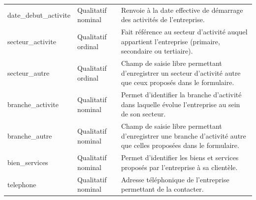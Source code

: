 \documentclass[12pt, a4paper, oneside]{report}
\begin{document}
\begin{table}[H]
\begin{tabularx}{\textwidth}{
				>{\ttfamily\raggedright\arraybackslash}p{3.8cm}
				>{\raggedright\arraybackslash}p{2.8cm}
				>{\raggedright\arraybackslash}X}
			\rowcolor{lightgray}
			date\_debut\_activite
			& Qualitatif nominal
			& Renvoie à la date effective de démarrage des activités
			de l'entreprise. \\
			
			secteur\_activite
			& Qualitatif ordinal
			& Fait référence au secteur d'activité auquel appartient
			l'entreprise (primaire, secondaire ou tertiaire). \\
			
			\rowcolor{lightgray}
			secteur\_autre
			& Qualitatif ordinal
			& Champ de saisie libre permettant d'enregistrer un secteur
			d'activité autre que ceux proposés dans le formulaire. \\
			
			branche\_activite
			& Qualitatif nominal
			& Permet d'identifier la branche d'activité dans laquelle
			évolue l'entreprise au sein de son secteur. \\
			
			\rowcolor{lightgray}
			branche\_autre
			& Qualitatif nominal
			& Champ de saisie libre permettant d'enregistrer une branche
			d'activité autre que celles proposées dans le formulaire. \\
			
			bien\_services
			& Qualitatif nominal
			& Permet d'identifier les biens et services proposés
			par l'entreprise à sa clientèle. \\
			
			\rowcolor{lightgray}
			telephone
			& Qualitatif nominal
			& Adresse téléphonique de l'entreprise permettant
			de la contacter. \\
			
			
			\bottomrule
		\end{tabularx}
	\end{table}
	
\end{document}
